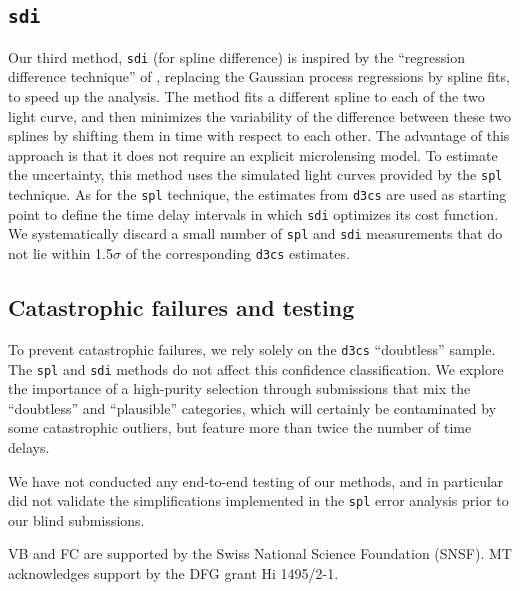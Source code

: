 \documentclass[traditabstract]{aa}
\begin{document}
\subsection{\tt sdi}

Our third method, {\tt sdi} (for spline difference) is inspired by the ``regression difference technique'' of \citet{pycs}, replacing the Gaussian process regressions by spline fits, to speed up the analysis. The method fits a different spline to each of the two light curve, and then minimizes the variability of the difference between these two splines by shifting them in time with respect to each other. The advantage of this approach is that it does not require an explicit microlensing model. To estimate the uncertainty, this method uses the simulated light curves provided by the {\tt spl} technique. As for the {\tt spl} technique, the estimates from {\tt d3cs} are used as starting point to define the time delay intervals in which {\tt sdi} optimizes its cost function. We systematically discard a small number of {\tt spl} and {\tt sdi} measurements that do not lie within 1.5$\sigma$ of the corresponding {\tt d3cs} estimates.


\subsection{Catastrophic failures and testing}

To prevent catastrophic failures, we rely solely on the {\tt d3cs} ``doubtless'' sample. The {\tt spl} and {\tt sdi} methods do not affect this confidence classification. We explore the importance of a high-purity selection through submissions that mix the ``doubtless'' and ``plausible'' categories, which will certainly be contaminated by some catastrophic outliers, but feature more than twice the number of time delays.

We have not conducted any end-to-end testing of our methods, and in particular did not validate the simplifications implemented in the {\tt spl} error analysis prior to our blind submissions. 





\begin{acknowledgements}
VB and FC are supported by the Swiss National Science Foundation (SNSF). MT acknowledges support by the DFG grant Hi 1495/2-1.
\end{acknowledgements}




\end{document}
